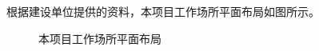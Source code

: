 根据建设单位提供的资料，本项目工作场所平面布局如图所示。

\begin{figure}[H]
\centering
{}
\caption{本项目工作场所平面布局}
\label{fig:ch2-5-f2-c568cd97}
\end{figure}
